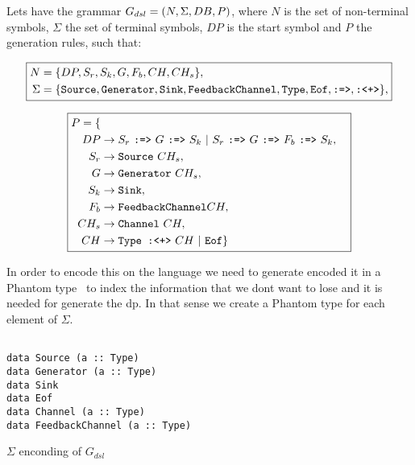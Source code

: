 \begin{definition}
Lets have the grammar $G_{dsl} = (N, \Sigma, DB, P)$, where $N$ is the set of non-terminal symbols, $\Sigma$ the set of terminal symbols,
$DP$ is the start symbol and $P$ the generation rules, such that:

\begin{equation*}
    \boxed{
      \begin{aligned}
    N &= \{DP,S_r,S_k,G,F_b,CH,CH_s\},\\
    \Sigma &= \{\text{\texttt{Source}},\text{\texttt{Generator}},\text{\texttt{Sink}},\text{\texttt{FeedbackChannel}},\text{\texttt{Type}},\text{\texttt{Eof}},\text{\texttt{:=>}},\text{\texttt{:<+>}}\},
    \end{aligned}
    }
\end{equation*}

\begin{equation*}
  \boxed{
    \begin{aligned}
  P = \{\\
  DP  &\rightarrow S_r\ \text{\texttt{:=>}}\ G\ \text{\texttt{:=>}}\ S_k\ |\ S_r\ \text{\texttt{:=>}}\ G\ \text{\texttt{:=>}}\ F_b\ \text{\texttt{:=>}}\ S_k,\\
  S_r &\rightarrow \text{\texttt{Source}}\ CH_s,\\
  G   &\rightarrow \text{\texttt{Generator}}\ CH_s,\\
  S_k &\rightarrow \text{\texttt{Sink}},\\
  F_b &\rightarrow \text{\texttt{FeedbackChannel}} CH,\\
  CH_s &\rightarrow \text{\texttt{Channel}}\ CH,\\
  CH &\rightarrow \text{\texttt{Type :<+>}}\ CH\ |\ \text{\texttt{Eof}}\}
\end{aligned}
}
\end{equation*}
\end{definition}

In order to encode this on the language we need to generate encoded it in a Phantom type~\cite{type-index} 
to index the information that we dont want to lose and it is needed for generate the \acrshort{dp}. 
In that sense we create a Phantom type for each element of $\Sigma$.

\begin{listing}[H]
  \begin{verbatim}

data Source (a :: Type)
data Generator (a :: Type)
data Sink
data Eof
data Channel (a :: Type)
data FeedbackChannel (a :: Type)

  \end{verbatim}
  \caption{$\Sigma$ enconding of $G_{dsl}$}
  \label{src:dpfh:1}
\end{listing}
  
